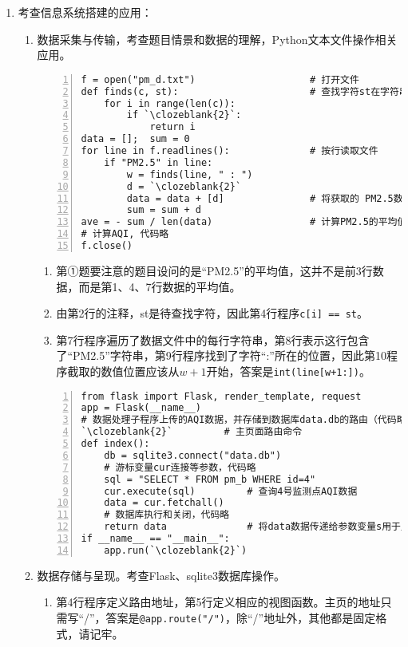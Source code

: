 \begin{enumerate}
\item 考查信息系统搭建的应用：
	\begin{enumerate}[label=$(\arabic*)$]
	\item 数据采集与传输，考查题目情景和数据的理解，Python文本文件操作相关应用。
\setcounter{qnumber}{1}
\begin{lstlisting}[numbers=left]
f = open("pm_d.txt") 					# 打开文件
def finds(c, st):						# 查找字符st在字符串c中的位置
    for i in range(len(c)):
        if `\clozeblank{2}`:
            return i
data = [];  sum = 0
for line in f.readlines():			    # 按行读取文件
    if "PM2.5" in line:
        w = finds(line, " : ")
        d = `\clozeblank{2}`
        data = data + [d] 				# 将获取的 PM2.5数据保存到列表中
        sum = sum + d 
ave = - sum / len(data) 				# 计算PM2.5的平均值
# 计算AQI, 代码略
f.close()
\end{lstlisting}
		\begin{enumerate}[label=$(\alph*)$]
		\item 第①题要注意的题目设问的是“PM2.5”的平均值，这并不是前3行数据，而是第1、4、7行数据的平均值。
		\item 由第2行的注释，st是待查找字符，因此第4行程序\lstinline|c[i] == st|。
		\item 第7行程序遍历了数据文件中的每行字符串，第8行表示这行包含了“PM2.5”字符串，第9行程序找到了字符“:”所在的位置，因此第10程序截取的数值位置应该从$w+1$开始，答案是\lstinline|int(line[w+1:])|。
		\end{enumerate}	
\setcounter{qnumber}{1}
\begin{lstlisting}[numbers=left]
from flask import Flask, render_template, request
app = Flask(__name__)
# 数据处理子程序上传的AQI数据，并存储到数据库data.db的路由（代码略）
`\clozeblank{2}` 	  	 # 主页面路由命令
def index():
    db = sqlite3.connect("data.db")
    # 游标变量cur连接等参数，代码略
    sql = "SELECT * FROM pm_b WHERE id=4"
    cur.execute(sql)         # 查询4号监测点AQI数据
    data = cur.fetchall()
    # 数据库执行和关闭，代码略
    return data              # 将data数据传递给参数变量s用于显示在网页中
if __name__ == "__main__":
    app.run(`\clozeblank{2}`)
\end{lstlisting}
	\item 数据存储与呈现。考查Flask、sqlite3数据库操作。
		\begin{enumerate}[label=$(\alph*)$]
		\item 第4行程序定义路由地址，第5行定义相应的视图函数。主页的地址只需写“/”，答案是\lstinline|@app.route("/")|，除“/”地址外，其他都是固定格式，请记牢。

\end{enumerate}
\end{enumerate}
\end{enumerate}
